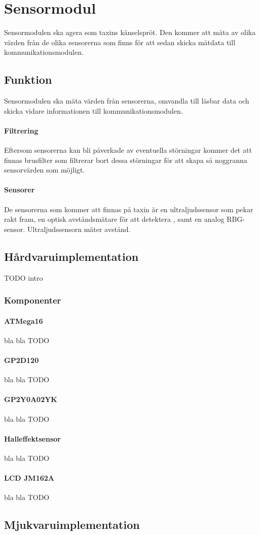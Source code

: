 \documentclass[designspec/spec.tex]{subfiles}
\begin{document}
\section{Sensormodul}
Sensormodulen ska agera som taxins känselspröt. Den kommer att mäta av olika
värden från de olika sensorerna som finns för att sedan skicka mätdata till
kommunikationsmodulen.

\subsection{Funktion}
Sensormodulen ska mäta värden från sensorerna, omvandla till läsbar data och
skicka vidare informationen till kommunikationsmodulen.

\paragraph{Filtrering}
Eftersom sensorerna kan bli påverkade av eventuella störningar kommer det att
finnas brusfilter som filtrerar bort dessa störningar för att skapa så
noggranna sensorvärden som möjligt.

\paragraph{Sensorer}
De sensorerna som kommer att finnas på taxin är en ultraljudssensor som pekar
rakt fram, en optisk avståndsmätare för att detektera , samt en analog RBG-sensor.
Ultraljudssensorn mäter avstånd.

\subsection{Hårdvaruimplementation} 
TODO intro

\subsubsection{Komponenter}
\paragraph{ATMega16} bla bla TODO
\paragraph{GP2D120} bla bla TODO
\paragraph{GP2Y0A02YK} bla bla TODO
\paragraph{Halleffektsensor} bla bla TODO
\paragraph{LCD JM162A} bla bla TODO

\subsection{Mjukvaruimplementation} 
\end{document}
